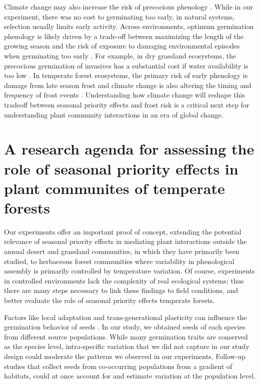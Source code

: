 \documentclass{article}[11pt]
\begin{document}
Climate change may also increase the risk of precocious phenology \citep{Inouye:2000ud}. While in our experiment, there was no cost to germinating too early, in natural systems, selection usually limits early activity. Across environments, optimum germination phenology is likely driven by a trade-off between maximizing the length of the growing season and the risk of exposure to damaging environmental episodes when germinating too early \citep{Augspurger:2017vu}. For example, in dry grassland ecosystems, the precocious germination of invasives has a substantial cost if water availability is too low \citep{Wainwright_2011}. In temperate forest ecosystems, the primary risk of early phenology is damage from late season frost \citep{Kollas:2014vn} and climate change is also altering the timing and frequency of frost events \citep{Ma:2019uf}. Understanding how climate change will reshape this tradeoff between seasonal priority effects and frost risk is a critical next step for understanding plant community interactions in an era of global change. 

\section*{A research agenda for assessing the role of seasonal priority effects in plant communites of temperate forests}

Our experiments offer an important proof of concept, extending the potential relevance of seasonal priority effects in mediating plant interactions outside the annual desert and grassland communities, in which they have primarily been studied, to herbaceous forest communities where variability in phenological assembly is primarily controlled by temperature variation. Of course, experiments in controlled environments lack the complexity of real ecological systems; thus there are many steps necessary to link these findings to field conditions, and better evaluate the role of seasonal priority effects temperate forests.

Factors like local adaptation and trans-generational plasticity can influence the germination behavior of seeds \citep{Donohue:2010uy,Baughman:2019ty}. In our study, we obtained seeds of each species from different source populations. While many germination traits are conserved as the species level, intra-specific variation that we did not capture in our study design could moderate the patterns we observed in our experiments. Follow-up studies that collect seeds from co-occurring populations from a gradient of habitats, could at once account for and estimate variation at the population level. %
\end{document}
